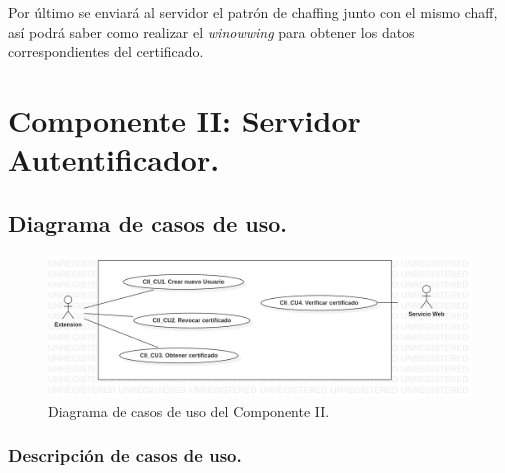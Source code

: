 \documentclass[12pt, a4paper, titlepage]{report}
\begin{document}
    		    Por último se enviará al servidor el patrón de chaffing junto con el mismo chaff, así podrá saber como realizar el \textit{winowwing} para obtener los datos correspondientes del certificado.


    \section{Componente II: Servidor Autentificador.}
			
		\subsection{Diagrama de casos de uso.}
		
			\begin{figure}[H]
            	\begin{center}	\includegraphics[width=13cm]{./imagenes/Disenio/Componente_2/CII_UCD.png}
            	\caption{Diagrama de casos de uso del Componente II.}
            	\end{center}
    		\end{figure}
		    
		\subsubsection{Descripción de casos de uso.}
		
\end{document}
